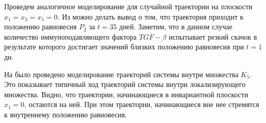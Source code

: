 \documentclass[14pt,a4paper]{extarticle}
\begin{document}
\begin{example}
		Проведем аналогичное моделирование для случайной траектории на плоскости $x_1=x_3=x_5=0$. Из  можно делать вывод о том, что траектория приходит к положению равновесия $P_2$ за $t=35$ дней. Заметим, что в данном случае количество иммуноподавляющего фактора $TGF-\beta$ испытывает резкий скачок в результате которого достигает значений близких положению равновесия при $t=1$ дн. 	
		
		На  было проведено моделирование траекторий системы внутри множества $K_5$. Это показывает типичный ход траекторий системы внутри локализирующего множества. Видно, что траектории, начинающиеся в инвариантной плоскости $x_1=0$, остаются на ней. При этом траектории, начинающиеся вне нее стремятся к внутреннему положению равновесия.
	\end{example}
	
\end{document}
